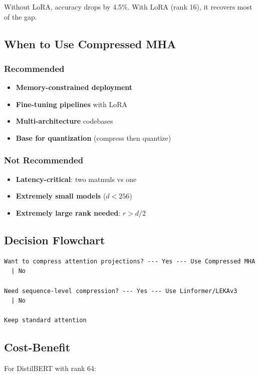 Without LoRA, accuracy drops by 4.5\%. With LoRA (rank 16), it 
recovers most of the gap.

\subsection{When to Use Compressed MHA}

\subsubsection{Recommended}
\begin{itemize}
\item \textbf{Memory-constrained deployment}
\item \textbf{Fine-tuning pipelines} with LoRA
\item \textbf{Multi-architecture} codebases
\item \textbf{Base for quantization} (compress then quantize)

\end{itemize}
\subsubsection{Not Recommended}
\begin{itemize}
\item \textbf{Latency-critical}: two matmuls vs one
\item \textbf{Extremely small models} ($d < 256$)
\item \textbf{Extremely large rank needed}: $r > d/2$

\end{itemize}
\subsection{Decision Flowchart}

\begin{lstlisting}
Want to compress attention projections? --- Yes --- Use Compressed MHA
  | No
   
Need sequence-level compression? --- Yes --- Use Linformer/LEKAv3
  | No
   
Keep standard attention
\end{lstlisting}

\subsection{Cost-Benefit}

For DistilBERT with rank 64:

